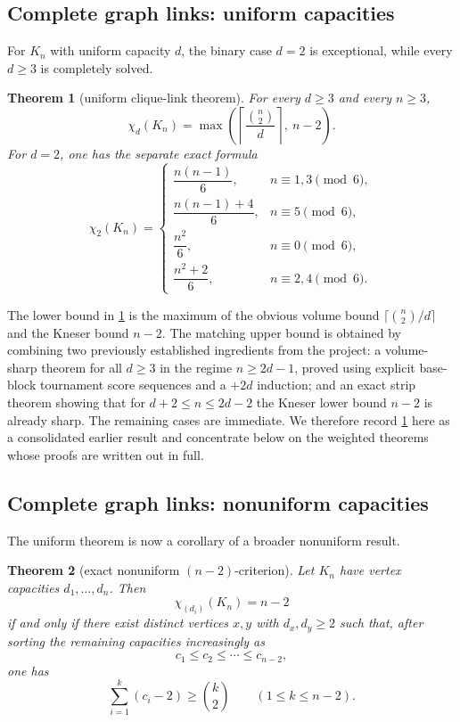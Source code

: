 \documentclass[11pt]{article}
\newtheorem{theorem}{Theorem}[section]
\theoremstyle{definition}
\newcommand{\Chi}{\chi}
\begin{document}
\subsection{Complete graph links: uniform capacities}
For \(K_n\) with uniform capacity \(d\), the binary case \(d=2\) is exceptional, while every \(d\ge 3\) is completely solved.

\begin{theorem}[uniform clique-link theorem]\label{thm:uniform-clique}
For every \(d\ge 3\) and every \(n\ge 3\),
\[
\Chi_d(K_n)=
\max\left(
\left\lceil\frac{\binom n2}{d}\right\rceil,
\ n-2
\right).
\]
For \(d=2\), one has the separate exact formula
\[
\Chi_2(K_n)=
\begin{cases}
\dfrac{n(n-1)}6, & n\equiv1,3\pmod6,\\[6pt]
\dfrac{n(n-1)+4}{6}, & n\equiv5\pmod6,\\[6pt]
\dfrac{n^2}{6}, & n\equiv0\pmod6,\\[6pt]
\dfrac{n^2+2}{6}, & n\equiv2,4\pmod6.
\end{cases}
\]
\end{theorem}

The lower bound in \cref{thm:uniform-clique} is the maximum of the obvious volume bound \(\lceil \binom n2/d\rceil\) and the Kneser bound \(n-2\). The matching upper bound is obtained by combining two previously established ingredients from the project: a volume-sharp theorem for all \(d\ge 3\) in the regime \(n\ge 2d-1\), proved using explicit base-block tournament score sequences and a \(+2d\) induction; and an exact strip theorem showing that for \(d+2\le n\le 2d-2\) the Kneser lower bound \(n-2\) is already sharp. The remaining cases are immediate. We therefore record \cref{thm:uniform-clique} here as a consolidated earlier result and concentrate below on the weighted theorems whose proofs are written out in full.

\subsection{Complete graph links: nonuniform capacities}
The uniform theorem is now a corollary of a broader nonuniform result.

\begin{theorem}[exact nonuniform \((n-2)\)-criterion]\label{thm:nonuniform-strip}
Let \(K_n\) have vertex capacities \(d_1,\dots,d_n\). Then
\[
\Chi_{(d_i)}(K_n)=n-2
\]
if and only if there exist distinct vertices \(x,y\) with \(d_x,d_y\ge 2\) such that, after sorting the remaining capacities increasingly as
\[
c_1\le c_2\le \cdots \le c_{n-2},
\]
one has
\[
\sum_{i=1}^k (c_i-2)\ge \binom{k}{2}
\qquad(1\le k\le n-2).
\]
\end{theorem}
\end{document}
